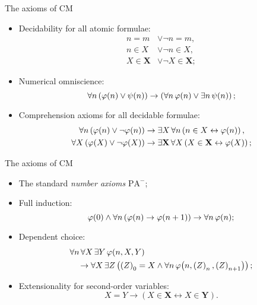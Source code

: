 \documentclass{beamer}
\begin{document}
\begin{frame}{The axioms of $\mathrm{CM}$}
  \begin{itemize}
    \item Decidability for all atomic formulae:
          \begin{align*}
            n = m            & \lor \neg n = m,            \\
            n \in X          & \lor \neg n \in X,          \\
            X \in \mathbf{X} & \lor \neg X \in \mathbf{X};
          \end{align*}

    \item Numerical omniscience:
          \[\forall n \left(\varphi\mleft(n\mright) \lor \psi\mleft(n\mright)\right) \rightarrow \left(\forall n \, \varphi\mleft(n\mright) \lor \exists n \, \psi\mleft(n\mright)\right);\]

    \item Comprehension axioms for all decidable formulae:
          \begin{align*}
            \forall n \left(\varphi\mleft(n\mright) \lor \neg \varphi\mleft(n\mright)\right) & \rightarrow \exists X \, \forall n \left(n \in X \leftrightarrow \varphi\mleft(n\mright)\right),                   \\
            \forall X \left(\varphi\mleft(X\mright) \lor \neg \varphi\mleft(X\mright)\right) & \rightarrow \exists \mathbf{X} \, \forall X \left(X \in \mathbf{X} \leftrightarrow \varphi\mleft(X\mright)\right);
          \end{align*}
  \end{itemize}
\end{frame}

\begin{frame}{The axioms of $\mathrm{CM}$}
  \begin{itemize}
    \item The standard \emph{number axioms} $\mathrm{PA}^-$;

    \item Full induction:
          \[\varphi\mleft(0\mright) \land \forall n \left(\varphi\mleft(n\mright) \rightarrow \varphi\mleft(n + 1\mright)\right) \rightarrow \forall n \, \varphi\mleft(n\mright);\]

    \item Dependent choice:
          \begin{align*}
             & \forall n \, \forall X \, \exists Y \, \varphi\mleft(n, X, Y\mright)                                                                                                \\
             & \quad {} \rightarrow \forall X \, \exists Z \left(\left(Z\right)_0 = X \land \forall n \, \varphi\mleft(n, \left(Z\right)_n, \left(Z\right)_{n + 1}\mright)\right);
          \end{align*}

    \item Extensionality for second-order variables:
          \[X = Y \rightarrow \left(X \in \mathbf{X} \leftrightarrow X \in \mathbf{Y}\right).\]
  \end{itemize}
\end{frame}
\end{document}
